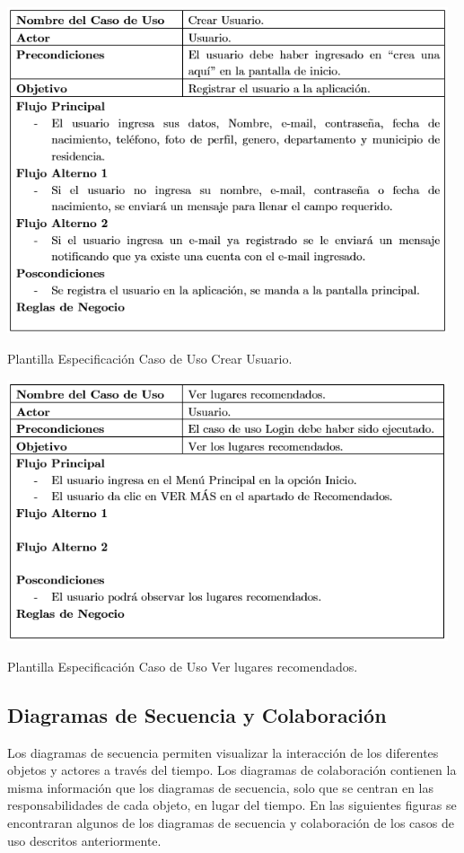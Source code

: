 \documentclass[12pt,letterpaper,openany]{book}
\begin{document}
\begin{table}[H]
\centering
\includegraphics[width=13cm]{./imagenes/PCU/crear_usuario}
\caption{Plantilla Especificación Caso de Uso Crear Usuario.}
\end{table}

\begin{table}[H]
\centering
\includegraphics[width=13cm]{./imagenes/PCU/ver_lugares_recomendados}
\caption{Plantilla Especificación Caso de Uso Ver lugares recomendados.}
\end{table}

\subsection{Diagramas de Secuencia y Colaboración}
Los diagramas de secuencia permiten visualizar la interacción de los diferentes objetos y actores a través del tiempo. Los diagramas de colaboración contienen la misma información que los diagramas de secuencia, solo que se centran en las responsabilidades de cada objeto, en lugar del tiempo. En las siguientes figuras se encontraran algunos de los diagramas de secuencia y colaboración de los casos de uso descritos anteriormente.
\end{document}
